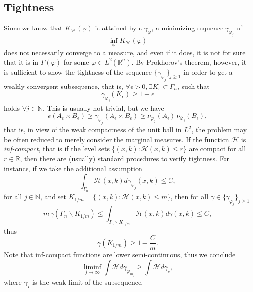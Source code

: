 \documentclass[12pt,a4paper]{article}
\newcommand{\RR}[1]{\mathbb{R}^#1}
\newcommand{\HH}{\mathcal{H}}
\begin{document}
\subsection{Tightness}
Since we know that $K_\HH(\varphi)$ is attained by a $\gamma_\varphi$, a minimizing
sequence $\gamma_{\varphi_j}$ of
\begin{displaymath}
     \inf_{\varphi} K_\HH(\varphi)
\end{displaymath}
does not necessarily converge to a measure, and even if it does, it is not for sure
that it is in $\Gamma(\varphi)$ for some $\varphi\in L^2(\RR n)$. By Prokhorov’s 
theorem, however, it is sufficient to show the tightness of the sequence
$\{\gamma_{\varphi_j}\}_{j\geq 1}$ in order to get a weakly convergent subsequence,
that is, $\forall\epsilon>0,\exists K_\epsilon\subset\Gamma_n$, such that
\begin{displaymath}
        \gamma_{\varphi_j}(K_\epsilon) \geq 1-\epsilon
\end{displaymath}
holds $\forall j\in \mathbb{N}$. This is usually not trivial, but we have 
\begin{displaymath}
   e(A_\epsilon\times B_\epsilon)\geq  \gamma_{\varphi_j}(A_\epsilon\times B_\epsilon) 
   \geq \nu_{\varphi_j}(A_\epsilon)\,\nu_{\hat\varphi_j}(B_\epsilon),        
\end{displaymath}
that is, in view of the weak compactness of the unit ball in $L^2$, the problem
may be often reduced to merely consider the marginal measures. If the function
$\HH$ is {\sl inf-compact}, that is if the level sets $\{(x,k):\HH(x,k)\leq r\}$ are compact
for all $r\in\mathbb{R}$, then there are (usually) standard procedures to verify
tightness. For instance, if we take the additional assumption
\begin{displaymath}
     \int_{\Gamma_n} \HH(x,k) d\gamma_{\varphi_j}(x,k) \leq C,
\end{displaymath} 
for all $j\in\mathbb{N}$, and set $K_{1/m}=\{(x,k):\HH(x,k)\leq m\}$, then for all
$\gamma\in \{\gamma_{\varphi_j}\}_{j\geq 1}$
\begin{displaymath}
   m\, \gamma(\Gamma_n\backslash K_{1/m})\leq 
      \int_{\Gamma_n\backslash K_{1/m}} \HH(x,k) d\gamma(x,k) \leq C,   
\end{displaymath}   
thus
\begin{displaymath}
     \gamma(K_{1/m}) \geq 1-\frac{C}{m}.
\end{displaymath}
Note that inf-compact functions are lower semi-continuous, thus we conclude
\begin{displaymath}
    \liminf_{j\rightarrow\infty} \int \HH d\gamma_{\varphi_{m_j}}\geq \int \HH d\gamma_\star,
\end{displaymath}
where $\gamma_\star$ is the weak limit of the subsequence.
%
%
\end{document}
